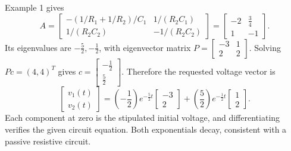 Example 1 gives
\[A=\begin{bmatrix}-(1/R_1+1/R_2)/C_1&1/(R_2C_1)\\
1/(R_2C_2)&-1/(R_2C_2)\end{bmatrix}=\left[\begin{matrix}-2 & \frac{3}{4}\\1 & -1\end{matrix}\right].\]
Its eigenvalues are $- \frac{5}{2},- \frac{1}{2}$, with eigenvector
matrix $P=\left[\begin{matrix}-3 & 1\\2 & 2\end{matrix}\right]$. Solving $Pc=(4,4)^T$
gives $c=\left[\begin{matrix}- \frac{1}{2}\\\frac{5}{2}\end{matrix}\right]$. Therefore the requested voltage vector is
\[\begin{bmatrix}v_1(t)\\v_2(t)\end{bmatrix}=\left(- \frac{1}{2}\right)e^{- \frac{5}{2}t}\left[\begin{matrix}-3\\2\end{matrix}\right]+\left(\frac{5}{2}\right)e^{- \frac{1}{2}t}\left[\begin{matrix}1\\2\end{matrix}\right].\]
Each component at zero is the stipulated initial voltage, and differentiating
verifies the given circuit equation. Both exponentials decay, consistent
with a passive resistive circuit.

